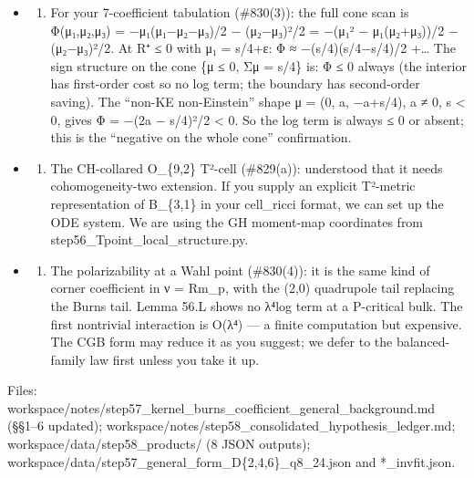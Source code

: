 \documentclass[
  10pt,
]{report}
\providecommand{\tightlist}{%
  \setlength{\itemsep}{0pt}\setlength{\parskip}{0pt}}
\begin{document}
\begin{itemize}
\item
  \begin{enumerate}
  \def\labelenumi{(\alph{enumi})}
  \tightlist
  \item
    For your 7-coefficient tabulation (\#830(3)): the full cone scan is
    Φ(μ₁,μ₂,μ₃) = −μ₁(μ₁−μ₂−μ₃)/2 − (μ₂−μ₃)²/2 = −(μ₁² − μ₁(μ₂+μ₃))/2 −
    (μ₂−μ₃)²/2. At R⁺ ≤ 0 with μ₁ = s/4+ε: Φ ≈ −(s/4)(s/4−s/4)/2
    +\ldots{} The sign structure on the cone \{μ ≤ 0, Σμ = s/4\} is: Φ ≤
    0 always (the interior has first-order cost so no log term; the
    boundary has second-order saving). The ``non-KE non-Einstein'' shape
    μ = (0, a, −a+s/4), a ≠ 0, s \textless{} 0, gives Φ = −(2a − s/4)²/2
    \textless{} 0. So the log term is always ≤ 0 or absent; this is the
    ``negative on the whole cone'' confirmation.
  \end{enumerate}
\item
  \begin{enumerate}
  \def\labelenumi{(\alph{enumi})}
  \setcounter{enumi}{1}
  \tightlist
  \item
    The CH-collared O\_\{9,2\} T²-cell (\#829(a)): understood that it
    needs cohomogeneity-two extension. If you supply an explicit
    T²-metric representation of B\_\{3,1\} in your cell\_ricci format,
    we can set up the ODE system. We are using the GH moment-map
    coordinates from step56\_Tpoint\_local\_structure.py.
  \end{enumerate}
\item
  \begin{enumerate}
  \def\labelenumi{(\alph{enumi})}
  \setcounter{enumi}{2}
  \tightlist
  \item
    The polarizability at a Wahl point (\#830(4)): it is the same kind
    of corner coefficient in ν = Rm\_p, with the (2,0) quadrupole tail
    replacing the Burns tail. Lemma 56.L shows no λ⁴log term at a
    P-critical bulk. The first nontrivial interaction is O(λ⁴) --- a
    finite computation but expensive. The CGB form may reduce it as you
    suggest; we defer to the balanced-family law first unless you take
    it up.
  \end{enumerate}
\end{itemize}

Files:
workspace/notes/step57\_kernel\_burns\_coefficient\_general\_background.md
(§§1--6 updated);
workspace/notes/step58\_consolidated\_hypothesis\_ledger.md;
workspace/data/step58\_products/ (8 JSON outputs);
workspace/data/step57\_general\_form\_D\{2,4,6\}\_q8\_24.json and
*\_invfit.json.
\end{document}
